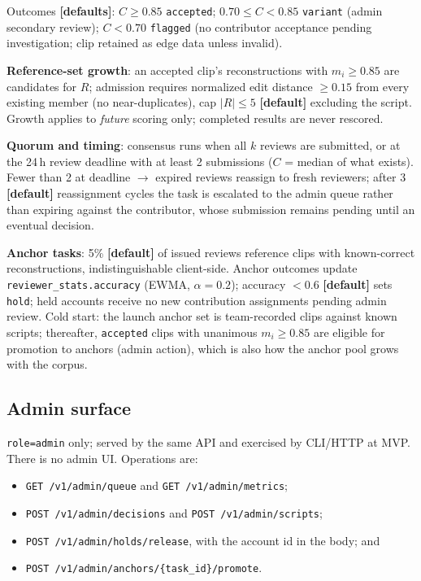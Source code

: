 \documentclass[11pt]{article}
\newcommand{\code}[1]{\texttt{#1}}
\begin{document}
Outcomes \textbf{[defaults]}: $C \geq 0.85$ \code{accepted}; $0.70 \leq C < 0.85$
\code{variant} (admin secondary review); $C < 0.70$ \code{flagged} (no contributor
acceptance pending investigation; clip retained as edge data unless invalid).

\textbf{Reference-set growth}: an accepted clip's reconstructions with
$m_i \geq 0.85$ are candidates for $R$; admission requires normalized edit distance
$\geq 0.15$ from every existing member (no near-duplicates), cap $|R| \leq 5$
\textbf{[default]} excluding the script. Growth applies to \emph{future} scoring
only; completed results are never rescored.

\textbf{Quorum and timing}: consensus runs when all $k$ reviews are submitted, or
at the 24\,h review deadline with at least 2 submissions ($C$ = median of what
exists). Fewer than 2 at deadline $\to$ expired reviews reassign to fresh
reviewers; after 3 \textbf{[default]} reassignment cycles the task is escalated to
the admin queue rather than expiring against the contributor, whose submission
remains pending until an eventual decision.

\textbf{Anchor tasks}: 5\% \textbf{[default]} of issued reviews reference clips
with known-correct reconstructions, indistinguishable client-side. Anchor outcomes
update \code{reviewer\_stats.accuracy} (EWMA, $\alpha = 0.2$); accuracy $< 0.6$
\textbf{[default]} sets \code{hold}; held accounts receive no new contribution
assignments pending admin review. Cold start: the launch anchor set is team-recorded
clips against known scripts; thereafter, \code{accepted} clips with unanimous
$m_i \geq 0.85$ are eligible for promotion to anchors (admin action), which is also
how the anchor pool grows with the corpus.

\subsection{Admin surface}
\label{sec:admin}

\code{role=admin} only; served by the same API and exercised by CLI/HTTP at MVP.
There is no admin UI. Operations are:

\begin{itemize}[nosep]
  \item \code{GET /v1/admin/queue} and \code{GET /v1/admin/metrics};
  \item \code{POST /v1/admin/decisions} and \code{POST /v1/admin/scripts};
  \item \code{POST /v1/admin/holds/release}, with the account id in the body; and
  \item \code{POST /v1/admin/anchors/\{task\_id\}/promote}.
\end{itemize}
\end{document}
